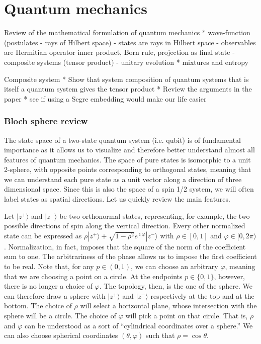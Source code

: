 

\def\>{\rangle}
\def\<{\langle}

\newcommand{\indicator}[1][A] {\mathbf{1}_{#1}} %



\chapter{Quantum mechanics}


Review of the mathematical formulation of quantum mechanics
* wave-function (postulates - rays of Hilbert space)
- states are rays in Hilbert space
- observables are Hermitian operator inner product, Born rule, projection as final state
- composite systems (tensor product)
- unitary evolution
* mixtures and entropy

Composite system
* Show that system composition of quantum systems that is itself a quantum system gives the tensor product
* Review the arguments in the paper
* see if using a Segre embedding would make our life easier

\subsection{Bloch sphere review}

The state space of a two-state quantum system (i.e. qubit) is of fundamental importance as it allows us to visualize and therefore better understand almost all features of quantum mechanics. The space of pure states is isomorphic to a unit 2-sphere, with opposite points corresponding to orthogonal states, meaning that we can understand each pure state as a unit vector along a direction of three dimensional space. Since this is also the space of a spin 1/2 system, we will often label states as spatial directions. Let us quickly review the main features.

Let $|z^+\>$ and $|z^-\>$ be two orthonormal states, representing, for example, the two possible directions of spin along the vertical direction. Every other normalized state can be expressed as $\rho |z^+\> + \sqrt{1-\rho^2}e^{\imath \varphi} |z^-\>$ with $\rho \in [0,1]$ and $\varphi \in [0,2\pi)$. Normalization, in fact, imposes that the square of the norm of the coefficient sum to one. The arbitrariness of the phase allows us to impose the first coefficient to be real. Note that, for any $p \in (0,1)$, we can choose an arbitrary $\varphi$, meaning that we are choosing a point on a circle. At the endpoints $p \in \{0,1\}$, however, there is no longer a choice of $\varphi$. The topology, then, is the one of the sphere. We can therefore draw a sphere with $|z^+\>$ and $|z^-\>$ respectively at the top and at the bottom. The choice of $\rho$ will select a horizontal plane, whose intersection with the sphere will be a circle. The choice of $\varphi$ will pick a point on that circle. That is, $\rho$ and $\varphi$ can be understood as a sort of ``cylindrical coordinates over a sphere.'' We can also choose spherical coordinates $(\theta, \varphi)$ such that $\rho = \cos \theta$.

